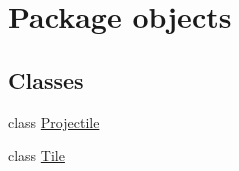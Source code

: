 \hypertarget{namespaceobjects}{}\section{Package objects}
\label{namespaceobjects}
\subsection*{Classes}
\begin{DoxyCompactItemize}
\item 
class \hyperlink{classobjects_1_1_projectile}{Projectile}
\item 
class \hyperlink{classobjects_1_1_tile}{Tile}
\end{DoxyCompactItemize}

